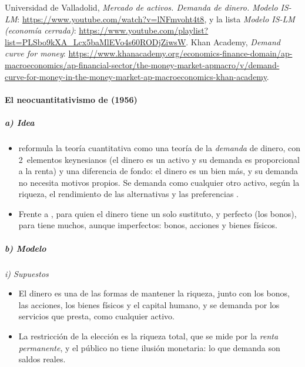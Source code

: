 \documentclass[11pt]{article}
\begin{document}
\begin{anotaciones}
Universidad de Valladolid, \emph{Mercado de activos. Demanda de dinero. Modelo IS-LM}: \url{https://www.youtube.com/watch?v=lNFmvoht4t8}, y la lista \emph{Modelo IS-LM (economía cerrada)}: \url{https://www.youtube.com/playlist?list=PLSbo9kXA_Lcx5baMlEVo4s60RODjZiwsW}. Khan Academy, \emph{Demand curve for money}: \url{https://www.khanacademy.org/economics-finance-domain/ap-macroeconomics/ap-financial-sector/the-money-market-apmacro/v/demand-curve-for-money-in-the-money-market-ap-macroeconomics-khan-academy}.
\end{anotaciones}

\paragraph{El neocuantitativismo de  (1956)}

\subparagraph{a) Idea}

\begin{itemize}
\item \textcite{Friedman1956Quantity} reformula la teoría cuantitativa como una teoría de la \emph{demanda} de dinero, con 2~elementos keynesianos (el dinero es un activo y su demanda es proporcional a la renta) y una diferencia de fondo: el dinero es un bien más, y su demanda no necesita motivos propios. Se demanda como cualquier otro activo, según la riqueza, el rendimiento de las alternativas y las preferencias .
\item Frente a , para quien el dinero tiene un solo sustituto, y perfecto (los bonos), para  tiene muchos, aunque imperfectos: bonos, acciones y bienes físicos.
\end{itemize}

\subparagraph{b) Modelo}

\hspace*{3.6em}\emph{i) Supuestos}

\begin{itemize}
\item El dinero es una de las formas de mantener la riqueza, junto con los bonos, las acciones, los bienes físicos y el capital humano, y se demanda por los servicios que presta, como cualquier activo.
\item La restricción de la elección es la riqueza total, que se mide por la \emph{renta permanente}, y el público no tiene ilusión monetaria: lo que demanda son saldos reales.
\end{itemize}
\end{document}
